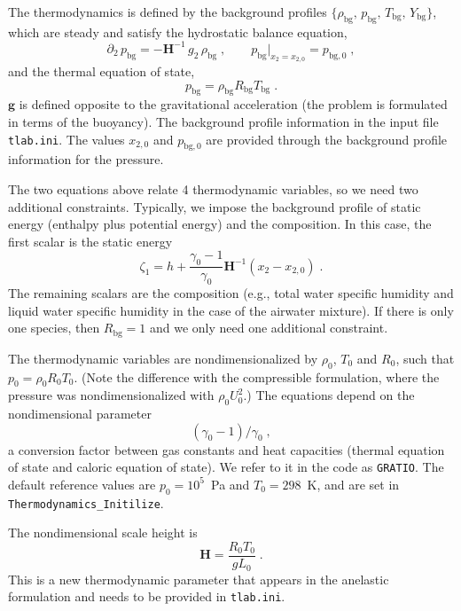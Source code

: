 The thermodynamics is defined by the background profiles $\{\rho_\mathrm{bg},\, p_\mathrm{bg},\, T_\mathrm{bg},\, Y_\mathrm{bg}\}$, which are steady and satisfy the hydrostatic balance equation,
\begin{equation}
    \partial_2\,p_\mathrm{bg}=-\mathbf{H}^{-1}\, g_2\,\rho_\mathrm{bg}\;,\qquad p_\mathrm{bg}|_{x_2=x_{2,0}}=p_{\mathrm{bg},0}\;,
\end{equation}
and the thermal equation of state,
\begin{equation}
    p_\mathrm{bg}  = \rho_\mathrm{bg} R_\mathrm{bg} T_\mathrm{bg} \;.
\end{equation}
$\mathbf{g}$ is defined opposite to the gravitational acceleration (the problem is formulated in terms of the buoyancy). The background profile information in the input file {\tt tlab.ini}. The values $x_{2,0}$ and $p_\mathrm{bg,0}$ are provided through the background profile information for the pressure. 

The two equations above relate 4 thermodynamic variables, so we need two additional constraints. Typically, we impose the background profile of static energy (enthalpy plus potential energy) and the composition. In this case, the first scalar is the static energy
\begin{equation}
    \zeta_1 = h + \frac{\gamma_0-1}{\gamma_0}\mathbf{H}^{-1}(x_2-x_{2,0}) \;.
\end{equation}
The remaining scalars are the composition (e.g., total water specific humidity and liquid water specific humidity in the case of the airwater mixture). If there is only one species, then $R_\mathrm{bg}=1$ and we only need one additional constraint. 

The thermodynamic variables are nondimensionalized by $\rho_0$, $T_0$ and $R_0$, such that $p_0=\rho_0R_0T_0$. (Note the difference with the compressible formulation, where the pressure was nondimensionalized with $\rho_0U_0^2$.) The equations depend on the nondimensional parameter
\begin{equation}
    (\gamma_0-1)/\gamma_0 \;,
\end{equation}
a conversion factor between gas constants and heat capacities (thermal equation of state and caloric equation of state). We refer to it in the code as \texttt{GRATIO}. The default reference values are $p_0=10^5$~Pa and $T_0=298$~K, and are set in \texttt{Thermodynamics\_Initilize}. 

The nondimensional scale height is
\begin{equation}
    \mathbf{H} = \frac{R_0T_0}{gL_0} \;.
\end{equation}
This is a new thermodynamic parameter that appears in the anelastic formulation and needs to be provided in \texttt{tlab.ini}. 

